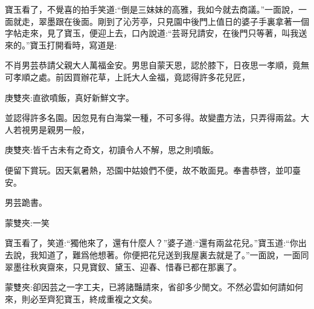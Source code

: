 \begin{parag}
    寶玉看了，不覺喜的拍手笑道:“倒是三妹妹的高雅，我如今就去商議。”一面說，一面就走，翠墨跟在後面。剛到了沁芳亭，只見園中後門上值日的婆子手裏拿著一個字帖走來，見了寶玉，便迎上去，口內說道:“芸哥兒請安，在後門只等著，叫我送來的。”寶玉打開看時，寫道是:
\end{parag}


\begin{qute2sp}
    \begin{parag}
        不肖男芸恭請父親大人萬福金安。男思自蒙天恩，認於膝下，日夜思一孝順，竟無可孝順之處。前因買辦花草，上託大人金福，竟認得許多花兒匠，\begin{note}庚雙夾:直欲噴飯，真好新鮮文字。\end{note}並認得許多名園。因忽見有白海棠一種，不可多得。故變盡方法，只弄得兩盆。大人若視男是親男一般，\begin{note}庚雙夾:皆千古未有之奇文，初讀令人不解，思之則噴飯。\end{note}便留下賞玩。因天氣暑熱，恐園中姑娘們不便，故不敢面見。奉書恭啓，並叩臺安。
    \end{parag}

    \begin{parag}
        男芸跪書。\begin{note}蒙雙夾:一笑\end{note}
    \end{parag}
\end{qute2sp}


\begin{parag}
    寶玉看了，笑道:“獨他來了，還有什麼人？”婆子道:“還有兩盆花兒。”寶玉道:“你出去說，我知道了，難爲他想著。你便把花兒送到我屋裏去就是了。”一面說，一面同翠墨往秋爽齋來，只見寶釵、黛玉、迎春、惜春已都在那裏了。\begin{note}蒙雙夾:卻因芸之一字工夫，已將諸豔請來，省卻多少閒文。不然必雲如何請如何來，則必至齊犯寶玉，終成重複之文矣。\end{note}
\end{parag}


